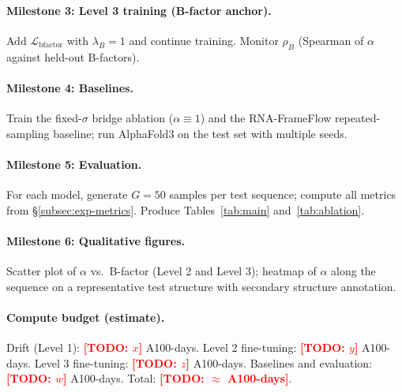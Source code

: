 \documentclass{article}
\theoremstyle{remark}
\theoremstyle{definition}
\newcommand{\todo}[1]{\textcolor{red}{\textbf{[TODO: #1]}}}
\begin{document}
\paragraph{Milestone 3: Level 3 training (B-factor anchor).}
Add $\mathcal{L}_{\text{bfactor}}$ with $\lambda_B=1$ and continue training.
Monitor $\rho_B$ (Spearman of $\alpha$ against held-out B-factors).

\paragraph{Milestone 4: Baselines.}
Train the fixed-$\sigma$ bridge ablation ($\alpha\equiv 1$) and the RNA-FrameFlow
repeated-sampling baseline; run AlphaFold3 on the test set with multiple
seeds.

\paragraph{Milestone 5: Evaluation.}
For each model, generate $G=50$ samples per test sequence; compute all metrics
from \S\ref{subsec:exp-metrics}. Produce Tables~\ref{tab:main}
and~\ref{tab:ablation}.

\paragraph{Milestone 6: Qualitative figures.}
Scatter plot of $\alpha$ vs.\ B-factor (Level 2 and Level 3); heatmap of
$\alpha$ along the sequence on a representative test structure with secondary
structure annotation.

\paragraph{Compute budget (estimate).}
Drift (Level 1): \todo{$x$} A100-days. Level 2 fine-tuning: \todo{$y$}
A100-days. Level 3 fine-tuning: \todo{$z$} A100-days. Baselines and
evaluation: \todo{$w$} A100-days. Total: \todo{$\approx$ A100-days}.
\end{document}
